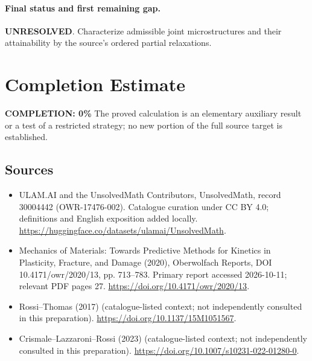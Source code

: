 \documentclass[11pt]{article}
\begin{document}
\paragraph{Final status and first remaining gap.}
\textbf{UNRESOLVED}. Characterize admissible joint microstructures and their attainability by the source’s ordered partial relaxations.

\section{Completion Estimate}
\noindent\textbf{COMPLETION: 0\%}
The proved calculation is an elementary auxiliary result or a test of a restricted strategy; no new portion of the full source target is established.

\subsection{Sources}
\begin{itemize}
\item[\hypertarget{source:30004442:1}{S1}] ULAM.AI and the UnsolvedMath Contributors, UnsolvedMath, record 30004442 (OWR-17476-002). Catalogue curation under CC BY 4.0; definitions and English exposition added locally.
\url{https://huggingface.co/datasets/ulamai/UnsolvedMath}.
\item[\hypertarget{source:30004442:2}{S2}] Mechanics of Materials: Towards Predictive Methods for Kinetics in Plasticity, Fracture, and Damage (2020), Oberwolfach Reports, DOI 10.4171/owr/2020/13, pp. 713--783. Primary report accessed 2026-10-11; relevant PDF pages 27.
\url{https://doi.org/10.4171/owr/2020/13}.
\item[\hypertarget{source:30004442:3}{S3}] Rossi--Thomas (2017) (catalogue-listed context; not independently consulted in this preparation).
\url{https://doi.org/10.1137/15M1051567}.
\item[\hypertarget{source:30004442:4}{S4}] Crismale--Lazzaroni--Rossi (2023) (catalogue-listed context; not independently consulted in this preparation).
\url{https://doi.org/10.1007/s10231-022-01280-0}.
\end{itemize}
\label{end:30004442}
\end{document}
